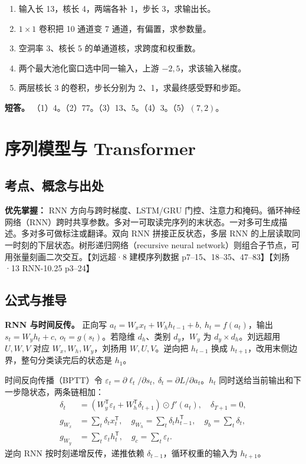 \documentclass[UTF8,a4paper,zihao=-4,fontset=fandol]{ctexart}
\begin{document}
\begin{enumerate}
\item 输入长 13，核长 4，两端各补 1，步长 3，求输出长。
\item $1\times1$ 卷积把 10 通道变 7 通道，有偏置，求参数量。
\item 空洞率 3、核长 5 的单通道核，求跨度和权重数。
\item 两个最大池化窗口选中同一输入，上游 $-2,5$，求该输入梯度。
\item 两层核长 3 的卷积，步长分别为 2、1，求最终感受野和步距。
\end{enumerate}
\textbf{短答。} （1）4。（2）77。（3）13、5。（4）3。（5）$(7,2)$。

\section{序列模型与 Transformer}
\subsection{考点、概念与出处}

\textbf{优先掌握：} RNN 方向与跨时梯度、LSTM/GRU 门控、注意力和掩码。循环神经网络（RNN）跨时共享参数。多对一可取读完序列的末状态。一对多可生成描述。多对多可做标注或翻译。双向 RNN 拼接正反状态，多层 RNN 的上层读取同一时刻的下层状态。树形递归网络（recursive neural network）则组合子节点，可用张量刻画二次交互。【刘远超·8 建模序列数据 p7--15、18--35、47--83】【刘扬·13 RNN-10.25 p3--24】

\subsection{公式与推导}

\textbf{RNN 与时间反传。} 正向写 $a_t=W_xx_t+W_hh_{t-1}+b,\ h_t=f(a_t)$，输出 $s_t=W_yh_t+c,\ o_t=g(s_t)$。若隐维 $d_h$、类别 $d_y$，$W_y$ 为 $d_y\times d_h$。刘远超用 $U,W,V$ 对应 $W_x,W_h,W_y$，刘扬用 $W,U,V$。逆向把 $h_{t-1}$ 换成 $h_{t+1}$，改用末侧边界，整句分类读完后的状态是 $h_1$。

时间反向传播（BPTT）令 $\varepsilon_t=\partial\ell_t/\partial s_t,\ \delta_t=\partial L/\partial a_t$。$h_t$ 同时送给当前输出和下一步隐状态，两条链相加：
\begin{align*}
 \delta_t&=(W_y^{\mathsf T}\varepsilon_t+
    W_h^{\mathsf T}\delta_{t+1})\odot f'(a_t),\quad \delta_{T+1}=0,\\
 g_{W_x}&=\sum_t\delta_tx_t^{\mathsf T},\quad
 g_{W_h}=\sum_t\delta_th_{t-1}^{\mathsf T},\quad g_b=\sum_t\delta_t,\\
 g_{W_y}&=\sum_t\varepsilon_t h_t^{\mathsf T},\quad g_c=\sum_t\varepsilon_t.
\end{align*}
逆向 RNN 按时刻递增反传，递推依赖 $\delta_{t-1}$，循环权重的输入为 $h_{t+1}$。
\end{document}
